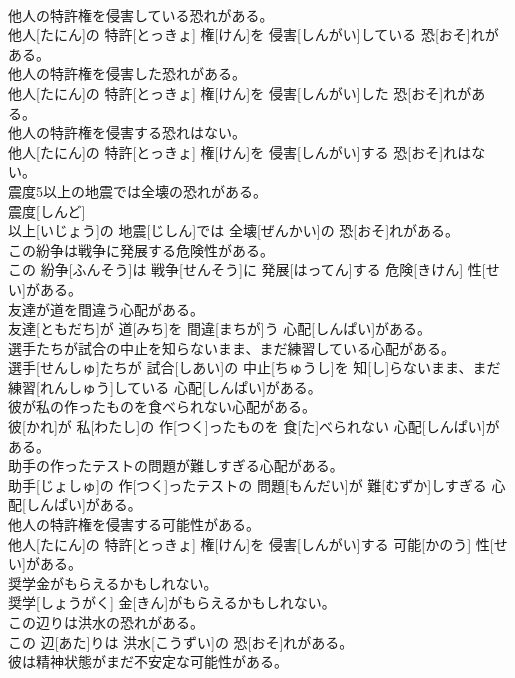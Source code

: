 \documentclass[8pt]{extreport}
\begin{document}
\begin{CJK}{UTF8}{min}
\\	他人の特許権を侵害している恐れがある。	
\\	他人[たにん]の 特許[とっきょ] 権[けん]を 侵害[しんがい]している 恐[おそ]れがある。
\\	他人の特許権を侵害した恐れがある。	
\\	他人[たにん]の 特許[とっきょ] 権[けん]を 侵害[しんがい]した 恐[おそ]れがある。
\\	他人の特許権を侵害する恐れはない。	
\\	他人[たにん]の 特許[とっきょ] 権[けん]を 侵害[しんがい]する 恐[おそ]れはない。
\\	震度5以上の地震では全壊の恐れがある。	
\\	震度[しんど] 
\\	以上[いじょう]の 地震[じしん]では 全壊[ぜんかい]の 恐[おそ]れがある。
\\	この紛争は戦争に発展する危険性がある。	
\\	この 紛争[ふんそう]は 戦争[せんそう]に 発展[はってん]する 危険[きけん] 性[せい]がある。
\\	友達が道を間違う心配がある。	
\\	友達[ともだち]が 道[みち]を 間違[まちが]う 心配[しんぱい]がある。
\\	選手たちが試合の中止を知らないまま、まだ練習している心配がある。	
\\	選手[せんしゅ]たちが 試合[しあい]の 中止[ちゅうし]を 知[し]らないまま、まだ 練習[れんしゅう]している 心配[しんぱい]がある。
\\	彼が私の作ったものを食べられない心配がある。	
\\	彼[かれ]が 私[わたし]の 作[つく]ったものを 食[た]べられない 心配[しんぱい]がある。
\\	助手の作ったテストの問題が難しすぎる心配がある。	
\\	助手[じょしゅ]の 作[つく]ったテストの 問題[もんだい]が 難[むずか]しすぎる 心配[しんぱい]がある。
\\	他人の特許権を侵害する可能性がある。	
\\	他人[たにん]の 特許[とっきょ] 権[けん]を 侵害[しんがい]する 可能[かのう] 性[せい]がある。
\\	奨学金がもらえるかもしれない。	
\\	奨学[しょうがく] 金[きん]がもらえるかもしれない。
\\	この辺りは洪水の恐れがある。	
\\	この 辺[あた]りは 洪水[こうずい]の 恐[おそ]れがある。
\\	彼は精神状態がまだ不安定な可能性がある。	

\end{CJK}
\end{document}

